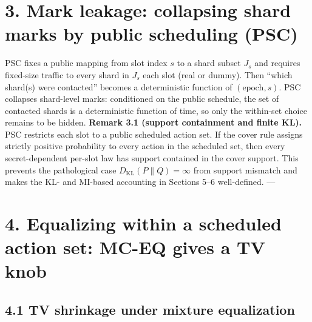 \documentclass[11pt]{article}
\begin{document}
\hypertarget{mark-leakage-collapsing-shard-marks-by-public-scheduling-psc}{%
\section{3. Mark leakage: collapsing shard marks by public scheduling
(PSC)}\label{mark-leakage-collapsing-shard-marks-by-public-scheduling-psc}}

PSC fixes a public mapping from slot index \(s\) to a shard subset
\(J_s\) and requires fixed-size traffic to every shard in \(J_s\) each
slot (real or dummy). Then ``which shard(s) were contacted'' becomes a
deterministic function of \((\text{epoch},s)\). PSC collapses
shard-level marks: conditioned on the public schedule, the set of
contacted shards is a deterministic function of time, so only the
within-set choice remains to be hidden. \textbf{Remark 3.1 (support
containment and finite KL).} PSC restricts each slot to a public
scheduled action set. If the cover rule assigns strictly positive
probability to every action in the scheduled set, then every
secret-dependent per-slot law has support contained in the cover
support. This prevents the pathological case
\(D_{\mathrm{KL}}(P\|Q)=\infty\) from support mismatch and makes the KL-
and MI-based accounting in Sections 5--6 well-defined. ---

\hypertarget{equalizing-within-a-scheduled-action-set-mc-eq-gives-a-tv-knob}{%
\section{4. Equalizing within a scheduled action set: MC-EQ gives a TV
knob}\label{equalizing-within-a-scheduled-action-set-mc-eq-gives-a-tv-knob}}

\hypertarget{tv-shrinkage-under-mixture-equalization}{%
\subsection{4.1 TV shrinkage under mixture
equalization}\label{tv-shrinkage-under-mixture-equalization}}
\end{document}
